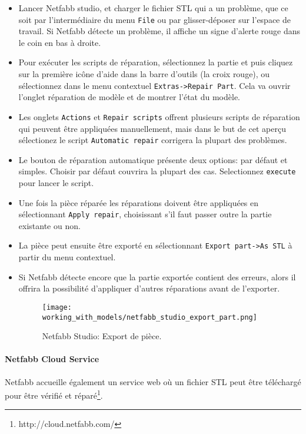 \begin{itemize}
	\item Lancer Netfabb studio, et charger le fichier STL qui a un problème, que ce soit par l'intermédiaire du menu \texttt{File} ou par glisser-déposer sur l'espace de travail. Si Netfabb détecte un problème, il affiche un signe d'alerte rouge dans le coin en bas à droite.
	\item Pour exécuter les scripts de réparation, sélectionnez la partie et puis cliquez sur la première icône d'aide dans la barre d'outils (la croix rouge), ou sélectionnez dans le menu contextuel \texttt{Extras->Repair Part}.  Cela va ouvrir l'onglet réparation de modèle et de montrer l'état du modèle.
	\item Les onglets \texttt{Actions} et \texttt{Repair scripts} offrent plusieurs scripts de réparation qui peuvent être appliquées manuellement, mais dans le but de cet aperçu sélectionez le script \texttt{Automatic repair} corrigera la plupart des problèmes.
	\item Le bouton de réparation automatique présente deux options: par défaut et simples. Choisir par défaut couvrira la plupart des cas. Selectionnez \texttt{execute} pour lancer le script.
	\item Une fois la pièce réparée les réparations doivent être appliquées en sélectionnant \texttt{Apply repair}, choisissant s'il faut passer outre la partie existante ou non.
	\item La pièce peut ensuite être exporté en sélectionnant \texttt{Export part->As STL} à partir du menu contextuel.
	\item Si Netfabb détecte encore que la partie exportée contient des erreurs, alors il offrira la possibilité d'appliquer d'autres réparations avant de l'exporter.
	\begin{figure}[H]
	\centering
	\texttt{[image: working\_with\_models/netfabb\_studio\_export\_part.png]}
	\caption{Netfabb Studio: Export de pièce.}
	\label{fig:netfabb_studio_export_part}
	\end{figure}
\end{itemize}

\paragraph{Netfabb Cloud Service} %
\label{par:netfabb_cloud_service}
Netfabb accueille également un service web où un fichier STL peut être téléchargé pour être vérifié et réparé\footnote{http://cloud.netfabb.com/}.  

